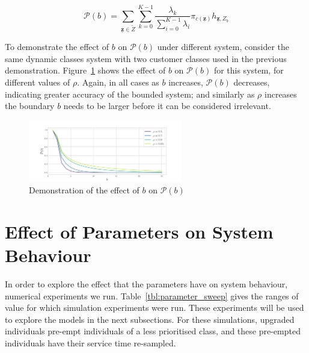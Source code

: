 \documentclass{article}
\begin{document}
\begin{equation}\label{eqn:hitting_measure}
\mathcal{P}(b) = \sum_{\underline{\mathbf{z}} \in \tilde{Z}} \sum_{k=0}^{K-1} \frac{\lambda_k}{\sum_{i=0}^{K-1} \lambda_i} \pi_{c(\underline{\mathbf{z}})} h_{\underline{\mathbf{z}}, Z_b}
\end{equation}

To demonstrate the effect of $b$ on $\mathcal{P}(b)$ under different system,
consider the same dynamic classes system with two customer classes used in the
previous demonstration. Figure~\ref{fig:hitting_measure} shows the effect of $b$
on $\mathcal{P}(b)$ for this system, for different values of $\rho$. Again, in
all cases as $b$ increases, $\mathcal{P}(b)$ decreases, indicating greater
accuracy of the bounded system; and similarly as $\rho$ increases the boundary
$b$ needs to be larger before it can be considered irrelevant.

\begin{figure}[!htbp]
  \begin{center}
    \includegraphics[width=0.6\textwidth]{img/hitting_check.pdf}
  \end{center}
  \caption{Demonstration of the effect of $b$ on $\mathcal{P}(b)$}
  \label{fig:hitting_measure}
\end{figure}


\section{Effect of Parameters on System Behaviour}\label{sec:behaviour}
In order to explore the effect that the parameters have on system behaviour,
numerical experiments we run. Table~\ref{tbl:parameter_sweep} gives the ranges
of value for which simulation experiments were run. These experiments will be
used to explore the models in the next subsections. For these simulations,
upgraded individuals pre-empt individuals of a less prioritised class, and these
pre-empted individuals have their service time re-sampled.
\end{document}
